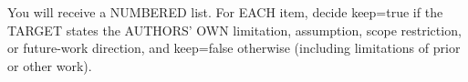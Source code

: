 You will receive a NUMBERED list. For EACH item, decide keep=true if the TARGET states the AUTHORS' OWN limitation, assumption, scope restriction, or future-work direction, and keep=false otherwise (including limitations of prior or other work).
